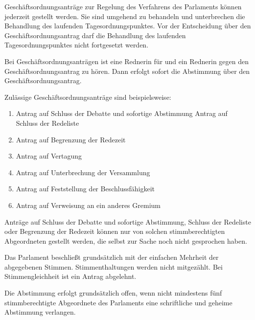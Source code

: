 \documentclass{sasbase}
\begin{document}
\begin{article}[Geschäftsordnungsantr\"{a}ge]
	\item Geschäftsordnungsanträge zur Regelung des Verfahrens des Parlaments können jederzeit gestellt werden. Sie sind umgehend zu behandeln und unterbrechen die Behandlung des laufenden Tagesordnungspunktes. Vor der Entscheidung über den Geschäftsordnungsantrag darf die Behandlung des laufenden Tagesordnungspunktes nicht fortgesetzt werden.
	\item Bei Geschäftsordnungsanträgen ist eine Rednerin  für und ein Rednerin gegen den Geschäftsordnungsantrag zu hören. Dann erfolgt sofort die Abstimmung über den Geschäftsordnungsantrag.
	\item Zulässige Geschäftsordnungsanträge sind beispielsweise:
		\begin{enumerate}
			\item Antrag auf Schluss der Debatte und sofortige Abstimmung   Antrag auf Schluss der Redeliste
			\item Antrag auf Begrenzung der Redezeit
			\item Antrag auf Vertagung
			\item Antrag auf Unterbrechung der Versammlung
			\item Antrag auf Feststellung der Beschlussfähigkeit   
			\item Antrag auf Verweisung an ein anderes Gremium
		\end{enumerate}
	\item Anträge auf Schluss der Debatte und sofortige Abstimmung, Schluss der Redeliste oder Begrenzung der Redezeit können nur von solchen stimmberechtigten Abgeordneten gestellt werden, die selbst zur Sache noch nicht gesprochen haben.
\end{article}
\begin{article}[Abstimmungen]
	\item Das Parlament beschließt grundsätzlich mit der einfachen Mehrheit der abgegebenen Stimmen. Stimmenthaltungen werden nicht mitgezählt. Bei Stimmengleichheit ist ein Antrag abgelehnt.
	\item Die Abstimmung erfolgt grundsätzlich offen, wenn nicht mindestens f\"{u}nf stimmberechtigte Abgeordnete des Parlaments eine schriftliche und geheime Abstimmung verlangen.
\end{article}
\end{document}
